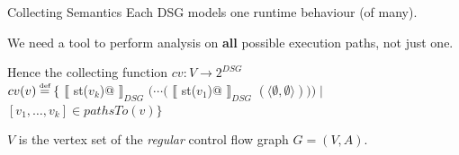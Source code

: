 \documentclass[xcolor={usenames,dvipsnames}]{beamer}
\makeatletter
\newcommand\defeq{\stackrel{\mathclap{\tiny\mbox{def}}}{=}}
\newcommand{\transformer}[2]{$\llbracket$ \lstinline@#1@ $\rrbracket_{#2}$}
\newcommand{\transformerDSG}[1]{\transformer{#1}{DSG}}
\makeatother
\begin{document}
\begin{frame}[fragile]{Collecting Semantics}
  Each DSG models one runtime behaviour (of many).

  \vspace{1em}

  We need a tool to perform analysis on \textbf{all} possible execution paths, not just one.

  \vspace{2em}

  Hence the collecting function $cv: V \to 2^{DSG}$ \\
  $cv(v) \defeq \{ $ \transformerDSG{st($v_k$)} $ ( \cdots ( $ \transformerDSG{st($v_1$)} $ ( \langle \emptyset, \emptyset \rangle ))) \mid $ \\
  \hspace{16em} $ \left[ v_1, \ldots, v_k \right] \in pathsTo(v) \} $

  \vspace{2em}

  $V$ is the vertex set of the \textit{regular} control flow graph $G = (V, A)$.
\end{frame}



\end{document}
